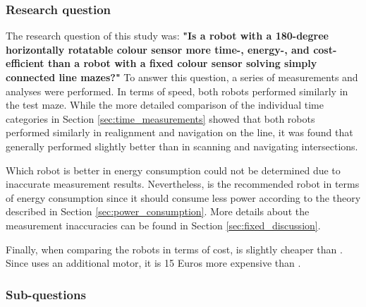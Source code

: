 \subsubsection{Research question} 
The research question of this study was: \textbf{"Is a robot with a 180-degree horizontally rotatable colour sensor more time-, energy-, and cost-efficient than a robot with a fixed colour sensor solving simply connected line mazes?"}
To answer this question, a series of measurements and analyses were performed. In terms of speed, both robots performed similarly in the test maze. While the more detailed comparison of the individual time categories in Section \ref{sec:time_measurements} showed that both robots performed similarly in realignment and navigation on the line, it was found that \TurnRob generally performed slightly better than \FixRob in scanning and navigating intersections.

Which robot is better in energy consumption could not be determined due to inaccurate measurement results. Nevertheless, \TurnRob is the recommended robot in terms of energy consumption since it should consume less power according to the theory described in Section \ref{sec:power_consumption}. More details about the measurement inaccuracies can be found in Section \ref{sec:fixed_discussion}.

Finally, when comparing the robots in terms of cost, \FixRob is slightly cheaper than \TurnRob. Since \TurnRob uses an additional motor, it is 15 Euros more expensive than \FixRob.


\subsubsection{Sub-questions}

